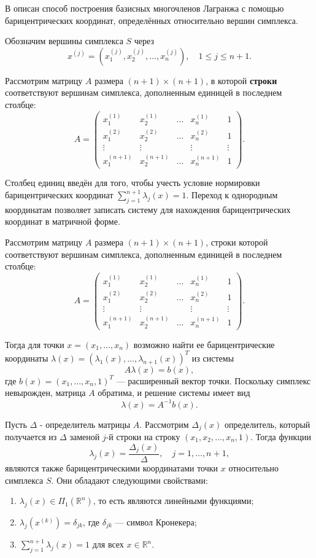 \documentclass[main]{subfiles}
\begin{document}
В \cite{nevsky_geo} описан способ построения базисных многочленов Лагранжа с помощью барицентрических координат, определённых относительно вершин симплекса.

Обозначим вершины симплекса $S$ через
\[
x^{(j)} = \left(x_1^{(j)}, x_2^{(j)}, \dots, x_n^{(j)}\right), \quad 1 \le j \le n+1.
\]

Рассмотрим матрицу $A$ размера $(n+1) \times (n+1)$, в которой \textbf{строки} соответствуют вершинам симплекса, дополненным единицей в последнем столбце:
\[
A = \begin{pmatrix}
x_1^{(1)} & x_2^{(1)} & \dots & x_n^{(1)} & 1 \\
x_1^{(2)} & x_2^{(2)} & \dots & x_n^{(2)} & 1 \\
\vdots & \vdots & & \vdots & \vdots \\
x_1^{(n+1)} & x_2^{(n+1)} & \dots & x_n^{(n+1)} & 1
\end{pmatrix}.
\]

Столбец единиц введён для того, чтобы учесть условие нормировки барицентрических координат $\sum_{j=1}^{n+1} \lambda_j(x) = 1$. Переход к однородным координатам позволяет записать систему для нахождения барицентрических координат в матричной форме.
\par
Рассмотрим матрицу $A$ размера $(n+1) \times (n+1)$, строки которой соответствуют вершинам симплекса, дополненным единицей в последнем столбце:
\[
A = \begin{pmatrix}
x_1^{(1)} & x_2^{(1)} & \dots & x_n^{(1)} & 1 \\
x_1^{(2)} & x_2^{(2)} & \dots & x_n^{(2)} & 1 \\
\vdots & \vdots & & \vdots & \vdots \\
x_1^{(n+1)} & x_2^{(n+1)} & \dots & x_n^{(n+1)} & 1
\end{pmatrix}.
\]
\par
Тогда для точки $x = (x_1, \dots, x_n)$ возможно найти ее барицентрические координаты $\lambda(x) = (\lambda_1(x), \dots, \lambda_{n+1}(x))^T$ из системы
\[
A \lambda(x) = b(x),
\]
где $b(x) = (x_1, \dots, x_n, 1)^T$ — расширенный вектор точки. Поскольку симплекс невырожден, матрица $A$ обратима, и решение системы имеет вид
\[
\lambda(x) = A^{-1} b(x).
\]
\par
Пусть $\Delta$ - определитель матрицы $A$. Рассмотрим $\Delta_j(x)$ определитель, который получается из $\Delta$ заменой $j$-й строки на строку $(x_1, x_2, \dots, x_n, 1)$. Тогда функции
\[
\lambda_j(x) = \frac{\Delta_j(x)}{\Delta}, \quad j = 1, \dots, n+1,
\]
являются также барицентрическими координатами точки $x$ относительно симплекса $S$. Они обладают следующими свойствами:
\begin{enumerate}
    \item $\lambda_j(x) \in \Pi_1(\mathbb{R}^n)$, то есть являются линейными функциями;
    \item $\lambda_j(x^{(k)}) = \delta_{jk}$, где $\delta_{jk}$ — символ Кронекера;
    \item $\sum_{j=1}^{n+1} \lambda_j(x) = 1$ для всех $x \in \mathbb{R}^n$.
\end{enumerate}
\end{document}
